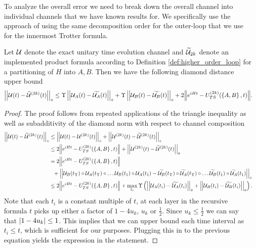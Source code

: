 To analyze the overall error we need to break down the overall channel into individual channels that we have known results for. We specifically
use the approach of using the same decomposition order for the outer-loop that we use for the innermost Trotter formula.
\begin{lemma} \label{lem:diamond_dist_higher_order}
Let $\mathcal{U}$ denote the exact unitary time evolution channel and $\widetilde{\mathcal{U}}_{2k}$ denote an implemented product formula according to Definition \ref{def:higher_order_loop} for a partitioning of $H$ into $A, B$. Then we have the following diamond distance upper bound
\begin{equation}
    \left| \left| \mathcal{U}(t) - \widetilde{\mathcal{U}}^{(2k)}(t) \right| \right|_\diamond \leq \Upsilon \left| \left| \mathcal{U}_A(t) - \widetilde{\mathcal{U}_A}(t) \right| \right|_\diamond + \Upsilon \left| \left| \mathcal{U}_B(t) - \widetilde{\mathcal{U}_B}(t) \right| \right|_\diamond  + 2 \norm{e^{i H t} - {U_{TS}^{( 2k )}}(\left\{ A,B \right\}, t)}.
\end{equation}
\begin{proof}
The proof follows from repeated applications of the triangle inequality as well as subadditivity of the diamond norm with respect to channel composition
\begin{align}
    \left| \left| \mathcal{U}(t) - \widetilde{\mathcal{U}}^{(2k)}(t) \right| \right|_\diamond &\leq \left| \left| \mathcal{U}(t) - \mathcal{U}^{(2k)}(t) \right| \right|_\diamond + \left| \left| \mathcal{U}^{(2k)}(t) - \widetilde{\mathcal{U}}^{(2k)}(t) \right| \right|_\diamond \\
    &\leq 2 \norm{e^{i H t} - {U_{TS}^{( 2k )}}(\left\{ A,B \right\}, t)} + \left| \left| \mathcal{U}^{(2k)}(t) - \widetilde{\mathcal{U}}^{(2k)}(t) \right| \right|_\diamond \\
    &= 2 \norm{e^{i H t} - {U_{TS}^{( 2k )}}(\left\{ A,B \right\}, t)} \nonumber \\
    & ~ ~ + \left| \left| \mathcal{U}_B(t_\Upsilon) \circ \mathcal{U}_A(t_\Upsilon) \circ \ldots \mathcal{U}_B(t_1) \circ \mathcal{U}_A(t_1) - \widetilde{\mathcal{U}_B}(t_\Upsilon) \circ \widetilde{\mathcal{U}_A}(t_\Upsilon) \circ \ldots \widetilde{\mathcal{U}_B}(t_1) \circ \widetilde{\mathcal{U}_A}(t_1) \right| \right|_\diamond \\
    &\leq 2 \norm{e^{i H t} - {U_{TS}^{( 2k )}}(\left\{ A,B \right\}, t)} + \max_{t_i} \Upsilon \left( \left| \left| \mathcal{U}_A(t_i) - \widetilde{\mathcal{U}_A}(t_i) \right| \right|_\diamond + \left| \left| \mathcal{U}_B(t_i) - \widetilde{\mathcal{U}_B}(t_i) \right| \right|_\diamond \right).
\end{align} 
Note that each $t_i$ is a constant multiple of $t$, at each layer in the recursive formula $t$ picks up either a factor of $1 - 4 u_k$, $u_k$ or $\frac{1}{2}$. Since $u_k \leq \frac{1}{2}$ we can say that $\abs{1 - 4 u_k} \leq 1$. This implies that we can upper bound each time interval as $t_i \leq t$, which is sufficient for our purposes. Plugging this in to the previous equation yields the expression in the statement.  
\end{proof}
\end{lemma}

